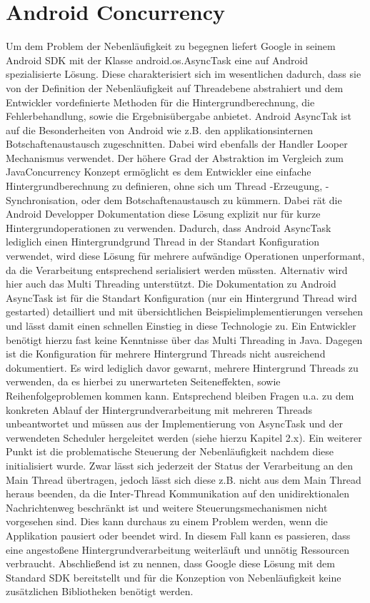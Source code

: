 \documentclass[12pt,oneside,a4paper,bibtotoc,liststotoc]{scrreprt}
\begin{document}
\section{Android Concurrency}
Um dem Problem der Nebenläufigkeit zu begegnen liefert Google in seinem Android SDK mit der Klasse android.os.AsyncTask eine auf Android spezialisierte Lösung. Diese charakterisiert sich im wesentlichen dadurch, dass sie von der Definition der Nebenläufigkeit auf Threadebene abstrahiert und dem Entwickler vordefinierte Methoden für die Hintergrundberechnung, die Fehlerbehandlung, sowie die Ergebnisübergabe anbietet. Android AsyncTak ist auf die Besonderheiten von Android wie z.B. den applikationsinternen Botschaftenaustausch zugeschnitten. Dabei wird ebenfalls der Handler Looper Mechanismus verwendet. Der höhere Grad der Abstraktion im Vergleich zum JavaConcurrency Konzept ermöglicht es dem Entwickler eine einfache Hintergrundberechnung zu definieren, ohne sich um Thread -Erzeugung, -Synchronisation, oder dem Botschaftenaustausch zu kümmern. Dabei rät die Android Developper Dokumentation diese Lösung explizit nur für kurze Hintergrundoperationen zu verwenden. Dadurch, dass Android AsyncTask lediglich einen Hintergrundgrund Thread in der Standart Konfiguration verwendet, wird diese Lösung für mehrere aufwändige Operationen unperformant, da die Verarbeitung entsprechend serialisiert werden müssten. Alternativ wird hier auch das Multi Threading unterstützt. Die Dokumentation zu Android AsyncTask ist für die Standart Konfiguration (nur ein Hintergrund Thread wird gestarted) detailliert und mit übersichtlichen Beispielimplementierungen versehen und lässt damit einen  schnellen Einstieg in diese Technologie zu. Ein Entwickler benötigt hierzu fast keine Kenntnisse über das Multi Threading in Java. Dagegen ist die Konfiguration für mehrere Hintergrund Threads nicht ausreichend dokumentiert. Es wird lediglich davor gewarnt, mehrere Hintergrund Threads zu verwenden, da es hierbei zu unerwarteten Seiteneffekten, sowie Reihenfolgeproblemen kommen kann. Entsprechend bleiben Fragen u.a. zu dem konkreten Ablauf der Hintergrundverarbeitung mit mehreren Threads unbeantwortet und müssen aus der Implementierung von AsyncTask und der verwendeten Scheduler hergeleitet werden (siehe hierzu Kapitel 2.x).\newline
Ein weiterer Punkt ist die problematische Steuerung der Nebenläufigkeit nachdem diese initialisiert wurde. Zwar lässt sich jederzeit der Status der Verarbeitung an den Main Thread übertragen, jedoch lässt sich diese z.B. nicht aus dem Main Thread heraus beenden, da die Inter-Thread Kommunikation auf den unidirektionalen Nachrichtenweg beschränkt ist und weitere Steuerungsmechanismen nicht vorgesehen sind. Dies kann durchaus zu einem Problem werden, wenn die Applikation pausiert oder beendet wird. In diesem Fall kann es passieren, dass eine angestoßene Hintergrundverarbeitung weiterläuft und unnötig Ressourcen verbraucht.\newline
Abschließend ist zu nennen, dass Google diese Lösung mit dem Standard SDK bereitstellt und für die Konzeption von Nebenläufigkeit keine zusätzlichen Bibliotheken benötigt werden.
\end{document}
